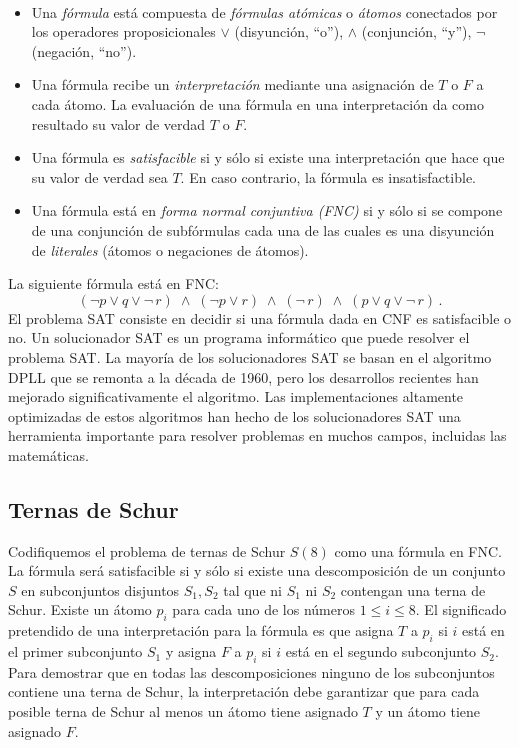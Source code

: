 \begin{definition}\label{def.sat}\mbox{}\\
\begin{itemize}
\item Una \emph{fórmula} está compuesta de \emph{fórmulas atómicas} o \emph{átomos} conectados por los operadores proposicionales $\vee$ (disyunción, ``o''), $\wedge$ (conjunción, ``y''), $\neg$ (negación, ``no'').
\item Una fórmula recibe un \emph{interpretación} mediante una asignación de $T$ o $F$ a cada átomo. La evaluación de una fórmula en una interpretación da como resultado su valor de verdad $T$ o $F$. 
\item Una fórmula es \emph{satisfacible} si y sólo si existe una interpretación que hace que su valor de verdad sea $T$. En caso contrario, la fórmula es insatisfactible.
\item Una fórmula está en \emph{forma normal conjuntiva (FNC)} si y sólo si se compone de una conjunción de subfórmulas cada una de las cuales es una disyunción de \emph{literales} (átomos o negaciones de átomos).
\end{itemize}
\end{definition}

La siguiente fórmula está en FNC:
\[
(\neg p \vee q \vee \neg \,r) \;\wedge\; (\neg p \vee r)
\;\wedge\; (\neg \,r)\;\wedge\;(p \vee q \vee \neg \,r)\,.
\]
El problema SAT consiste en decidir si una fórmula dada en CNF es satisfacible o no. Un solucionador SAT es un programa informático que puede resolver el problema SAT. La mayoría de los solucionadores SAT se basan en el algoritmo DPLL que se remonta a la década de 1960, pero los desarrollos recientes han mejorado significativamente el algoritmo. Las implementaciones altamente optimizadas de estos algoritmos han hecho de los solucionadores SAT una herramienta importante para resolver problemas en muchos campos, incluidas las matemáticas.

\subsection{Ternas de Schur}

Codifiquemos el problema de ternas de Schur $S(8)$ como una fórmula en FNC. La fórmula será satisfacible si y sólo si existe una descomposición de un conjunto $S$ en subconjuntos disjuntos $S_1,S_2$ tal que ni $S_1$ ni $S_2$ contengan una terna de Schur. Existe un átomo $p_i$ para cada uno de los números $1\leq i \leq 8$. El significado pretendido de una interpretación para la fórmula es que asigna $T$ a $p_i$ si $i$ está en el primer subconjunto $S_1$ y asigna $F$ a $p_i$ si $i$ está en el segundo subconjunto $S_2$. Para demostrar que en todas las descomposiciones ninguno de los subconjuntos contiene una terna de Schur, la interpretación debe garantizar que para cada posible terna de Schur al menos un átomo tiene asignado $T$ y un átomo tiene asignado $F$. 

